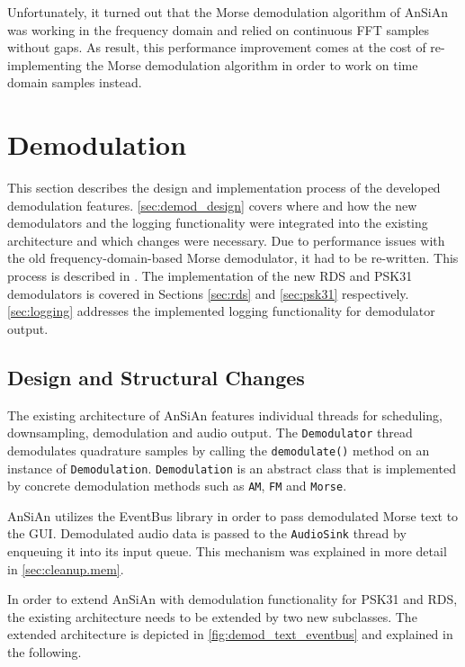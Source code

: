 Unfortunately, it turned out that the Morse demodulation
algorithm of \ac{AnSiAn} was working in the frequency
domain and relied on continuous \ac{FFT} samples without gaps.
As result, this performance improvement comes at the cost of re-implementing
the Morse demodulation algorithm in order to work on time domain samples
instead.


\section{Demodulation}

This section describes the design and implementation process of the developed demodulation features. \autoref{sec:demod_design} covers where and how the new demodulators and the logging functionality were integrated into the existing architecture and which changes were necessary. Due to performance issues with the old frequency-domain-based Morse demodulator, it had to be re-written. This process is described in \label{sec:morse_demod}. The implementation of the new \ac{RDS} and \ac{PSK31} demodulators is covered in Sections \ref{sec:rds} and \ref{sec:psk31} respectively. \autoref{sec:logging} addresses the implemented logging functionality for demodulator output.


\subsection{Design and Structural Changes\label{sec:demod_design}}

The existing architecture of \ac{AnSiAn} features individual threads for scheduling, 
downsampling, demodulation and audio output. The \texttt{De\-mo\-du\-la\-tor} thread demodulates 
quadrature samples by calling the \texttt{demodulate()} method on an instance of
\texttt{Demodulation}. \texttt{Demodulation} is an abstract class that is implemented by concrete 
demodulation methods such as \texttt{AM}, \texttt{FM} and \texttt{Morse}. 

\ac{AnSiAn} utilizes the EventBus library in order to pass demodulated Morse text
to the \ac{GUI}. Demodulated audio data is passed to the
\texttt{AudioSink} thread by enqueuing it into its input queue.
This mechanism was explained in more detail in \autoref{sec:cleanup.mem}.


In order to extend \ac{AnSiAn} with demodulation functionality for \ac{PSK31} and \ac{RDS}, 
the existing architecture needs to be extended by two new subclasses. The extended architecture is
depicted in \autoref{fig:demod_text_eventbus} and explained in the following.

